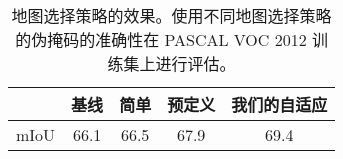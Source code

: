\begin{table}[]
\centering

{\small
\begin{tabular}{@{}ccccc@{}}
\toprule
                            & 基线  & 简单   & 预定义   & 我们的自适应 \\ \midrule
\multicolumn{1}{l}{mIoU}    &66.1       & 66.5      & 67.9          & 69.4   \\ \bottomrule
\end{tabular}
}
\vspace{2mm}
\caption{地图选择策略的效果。使用不同地图选择策略的伪掩码的准确性在 PASCAL VOC 2012 训练集上进行评估。} \vspace{-2mm}
\label{tab:strategy}
\end{table}
